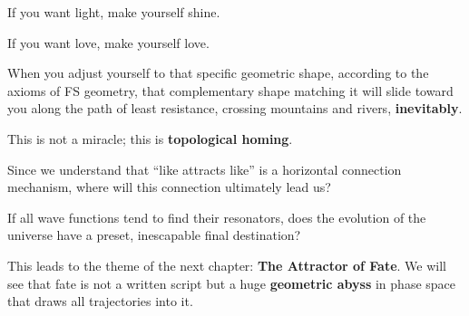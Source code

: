 If you want light, make yourself shine.

If you want love, make yourself love.

When you adjust yourself to that specific geometric shape, according to the axioms of FS geometry, that complementary shape matching it will slide toward you along the path of least resistance, crossing mountains and rivers, \textbf{inevitably}.

This is not a miracle; this is \textbf{topological homing}.

Since we understand that ``like attracts like'' is a horizontal connection mechanism, where will this connection ultimately lead us?

If all wave functions tend to find their resonators, does the evolution of the universe have a preset, inescapable final destination?

This leads to the theme of the next chapter: \textbf{The Attractor of Fate}. We will see that fate is not a written script but a huge \textbf{geometric abyss} in phase space that draws all trajectories into it.


